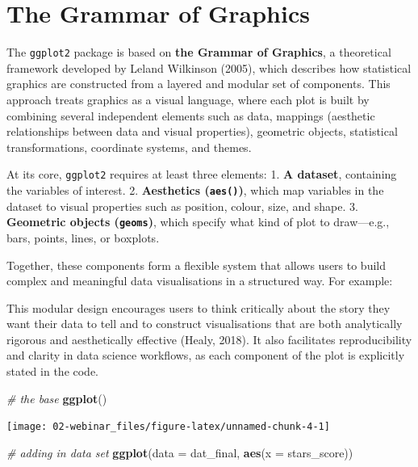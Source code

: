 \documentclass[
  oneside]{book}
\newenvironment{Shaded}{\begin{snugshade}}{\end{snugshade}}
\newcommand{\AttributeTok}[1]{\textcolor[rgb]{0.13,0.29,0.53}{#1}}
\newcommand{\CommentTok}[1]{\textcolor[rgb]{0.56,0.35,0.01}{\textit{#1}}}
\newcommand{\FunctionTok}[1]{\textcolor[rgb]{0.13,0.29,0.53}{\textbf{#1}}}
\newcommand{\NormalTok}[1]{#1}
\begin{document}
\section{The Grammar of Graphics}\label{the-grammar-of-graphics}

The \texttt{ggplot2} package is based on \textbf{the Grammar of Graphics}, a theoretical framework developed by Leland Wilkinson (2005), which describes how statistical graphics are constructed from a layered and modular set of components. This approach treats graphics as a visual language, where each plot is built by combining several independent elements such as data, mappings (aesthetic relationships between data and visual properties), geometric objects, statistical transformations, coordinate systems, and themes.

At its core, \texttt{ggplot2} requires at least three elements:
1. \textbf{A dataset}, containing the variables of interest.
2. \textbf{Aesthetics (\texttt{aes()})}, which map variables in the dataset to visual properties such as position, colour, size, and shape.
3. \textbf{Geometric objects (\texttt{geoms})}, which specify what kind of plot to draw---e.g., bars, points, lines, or boxplots.

Together, these components form a flexible system that allows users to build complex and meaningful data visualisations in a structured way. For example:

This modular design encourages users to think critically about the story they want their data to tell and to construct visualisations that are both analytically rigorous and aesthetically effective (Healy, 2018). It also facilitates reproducibility and clarity in data science workflows, as each component of the plot is explicitly stated in the code.

\begin{Shaded}
\begin{Highlighting}[]
\CommentTok{\# the base}
\FunctionTok{ggplot}\NormalTok{()}
\end{Highlighting}
\end{Shaded}

\begin{center}\texttt{[image: 02-webinar\_files/figure-latex/unnamed-chunk-4-1]} \end{center}

\begin{Shaded}
\begin{Highlighting}[]
\CommentTok{\# adding in data set}
\FunctionTok{ggplot}\NormalTok{(}\AttributeTok{data =}\NormalTok{ dat\_final, }\FunctionTok{aes}\NormalTok{(}\AttributeTok{x =}\NormalTok{ stars\_score))}
\end{Highlighting}
\end{Shaded}
\end{document}
